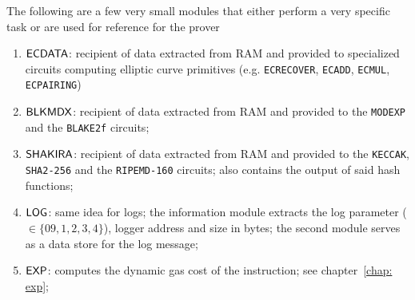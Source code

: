 The following are a few very small modules that either perform a very specific task or are used for reference for the prover
\begin{enumerate}[resume]
	\item $\textsf{ECDATA}$:
		recipient of data extracted from RAM and provided to specialized circuits computing elliptic curve primitives (e.g. \texttt{ECRECOVER}, \texttt{ECADD}, \texttt{ECMUL}, \texttt{ECPAIRING})
	\item $\textsf{BLKMDX}$:
		recipient of data extracted from RAM and provided to the \texttt{MODEXP} and the \texttt{BLAKE2f} circuits;
	\item $\textsf{SHAKIRA}$:
		recipient of data extracted from RAM and provided to the \texttt{KECCAK}, \texttt{SHA2-256} and the \texttt{RIPEMD-160} circuits;
		also contains the output of said hash functions;
	\item $\textsf{LOG}{}$:
		same idea for logs; the information module extracts the log parameter ($\in\{09,1,2,3,4\}$), logger address and size in bytes; the second module serves as a data store for the log message;
	\item $\textsf{EXP}{}$:
		computes the dynamic gas cost of the  instruction; see chapter~\ref{chap: exp};
\end{enumerate}

